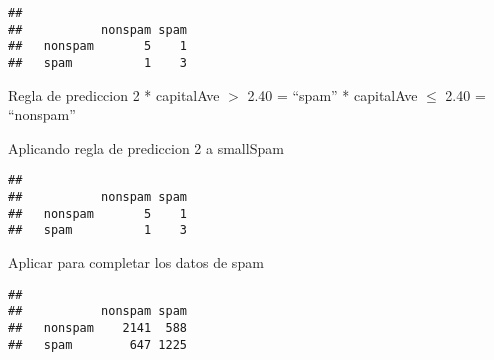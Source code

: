 \documentclass[
]{article}
\newenvironment{Shaded}{\begin{snugshade}}{\end{snugshade}}
\newcommand{\ConstantTok}[1]{\textcolor[rgb]{0.00,0.00,0.00}{#1}}
\newcommand{\ControlFlowTok}[1]{\textcolor[rgb]{0.13,0.29,0.53}{\textbf{#1}}}
\newcommand{\FloatTok}[1]{\textcolor[rgb]{0.00,0.00,0.81}{#1}}
\newcommand{\FunctionTok}[1]{\textcolor[rgb]{0.00,0.00,0.00}{#1}}
\newcommand{\NormalTok}[1]{#1}
\newcommand{\OtherTok}[1]{\textcolor[rgb]{0.56,0.35,0.01}{#1}}
\newcommand{\SpecialCharTok}[1]{\textcolor[rgb]{0.00,0.00,0.00}{#1}}
\newcommand{\StringTok}[1]{\textcolor[rgb]{0.31,0.60,0.02}{#1}}
\begin{document}
\begin{verbatim}
##          
##           nonspam spam
##   nonspam       5    1
##   spam          1    3
\end{verbatim}

Regla de prediccion 2 * capitalAve \(>\) 2.40 = ``spam'' * capitalAve
\(\leq\) 2.40 = ``nonspam''

Aplicando regla de prediccion 2 a smallSpam

\begin{Shaded}
\end{Shaded}

\begin{verbatim}
##          
##           nonspam spam
##   nonspam       5    1
##   spam          1    3
\end{verbatim}

Aplicar para completar los datos de spam

\begin{Shaded}
\end{Shaded}

\begin{verbatim}
##          
##           nonspam spam
##   nonspam    2141  588
##   spam        647 1225
\end{verbatim}

\begin{Shaded}
\end{Shaded}
\end{document}
